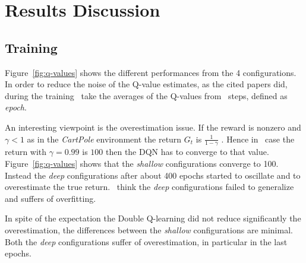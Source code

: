 \section{Results Discussion}

\subsection{Training}


Figure~\ref{fig:q-values} shows the different performances from the 4 configurations. In order to reduce the noise of the Q-value estimates, as the cited papers did, during the training \auth~take the averages of the Q-values from \numepoch~steps, defined as \textit{epoch}. %

An interesting viewpoint is the overestimation issue. If the reward is nonzero and $\gamma < 1$ as in the \textit{CartPole} environment the return $G_t$ is $\frac{1}{1 - \gamma}$ \cite{Sutton:1998:IRL:551283}. Hence in \authpp~case the return with $\gamma = 0.99$ is $100$ then the DQN has to converge to that value.
Figure~\ref{fig:q-values} shows that the \textit{shallow} configurations converge to 100. Instead the \textit{deep} configurations after about 400 epochs started to oscillate and to overestimate the true return. \Auth~think the \textit{deep} configurations failed to generalize and suffers of overfitting.

In spite of the expectation the Double Q-learning did not reduce significantly the overestimation, the differences between the \textit{shallow} configurations are minimal. Both the \textit{deep} configurations suffer of overestimation, in particular in the last epochs.


